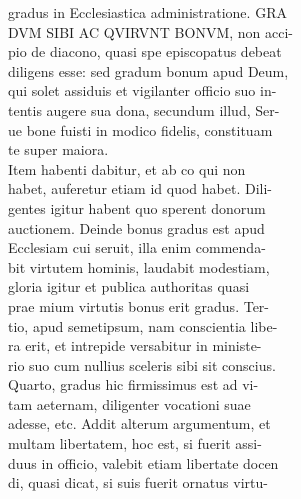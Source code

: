 \documentclass{article}
\begin{document}
\begin{pages}
                gradus in Ecclesiastica administratione. GRA \\
                DVM SIBI AC QVIRVNT BONVM, non acci- \\
                pio de diacono, quasi spe episcopatus debeat \\
                diligens esse: sed gradum bonum apud Deum, \\
                qui solet assiduis et vigilanter officio suo in- \\
                tentis augere sua dona, secundum illud, Ser- \\
                ue bone fuisti in modico fidelis, constituam \\
                te super maiora. \\
                Item habenti dabitur, et ab co qui non \\
                habet, auferetur etiam id quod habet. Dili- \\
                gentes igitur habent quo sperent donorum \\
                auctionem. Deinde bonus gradus est apud \\
                Ecclesiam cui seruit, illa enim commenda- \\
                bit virtutem hominis, laudabit modestiam, \\
                gloria igitur et publica authoritas quasi \\
                prae mium virtutis bonus erit gradus. Ter- \\
                tio, apud semetipsum, nam conscientia libe- \\
                ra erit, et intrepide versabitur in ministe- \\
                rio suo cum nullius sceleris sibi sit conscius. \\
                Quarto, gradus hic firmissimus est ad vi- \\
                tam aeternam, diligenter vocationi suae \\
                adesse, etc. Addit alterum argumentum, et \\
                multam libertatem, hoc est, si fuerit assi- \\
                duus in officio, valebit etiam libertate docen \\
                di, quasi dicat, si suis fuerit ornatus virtu- \\

\end{pages}
\end{document}
